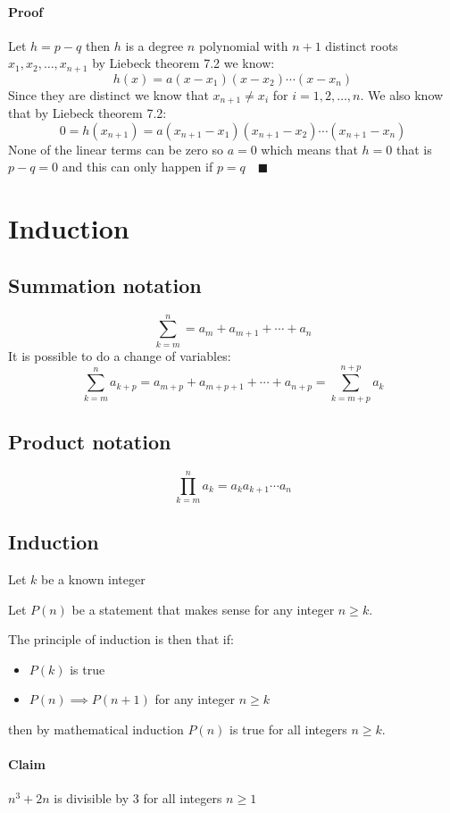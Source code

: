 \documentclass{article}
\begin{document}
\paragraph{Proof} Let \(h=p-q\) then \(h\) is a degree \(n\) polynomial with \(n+1\) distinct roots \(x_1,x_2,\dotsc,x_{n+1}\) by Liebeck theorem 7.2 we know:
\[h(x)=a(x-x_1)(x-x_2)\dotsm(x-x_n)\]
Since they are distinct we know that \(x_{n+1}\ne x_i\) for \(i=1,2,\dotsc,n\). We also know that by Liebeck theorem 7.2:
\[0=h(x_{n+1})=a(x_{n+1}-x_1)(x_{n+1}-x_2)\dotsm(x_{n+1}-x_n)\]
None of the linear terms can be zero so \(a=0\) which means that \(h=0\) that is \(p-q=0\) and this can only happen if \(p=q\quad\blacksquare\)

\section{Induction}

\subsection*{Summation notation}

\[\sum_{k=m}^n=a_m+a_{m+1}+\dotsb+a_n\]
It is possible to do a change of variables:
\[\sum_{k=m}^na_{k+p}=a_{m+p}+a_{m+p+1}+\dotsb+a_{n+p}=\sum_{k=m+p}^{n+p}a_k\]

\subsection*{Product notation}

\[\prod_{k=m}^na_k=a_ka_{k+1}\dotsm a_n\]

\subsection*{Induction}

Let \(k\) be a known integer

Let \(P(n)\) be a statement that makes sense for any integer \(n\ge k\).

The principle of induction is then that if:
\begin{itemize}
\item \(P(k)\) is true
\item \(P(n)\implies P(n+1)\) for any integer \(n\ge k\)
\end{itemize}
then by mathematical induction \(P(n)\) is true for all integers \(n\ge k\).

\paragraph{Claim} \(n^3+2n\) is divisible by 3 for all integers \(n\ge 1\)
\end{document}
